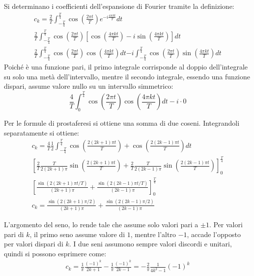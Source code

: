 \documentclass{article}
\begin{document}
Si determinano i coefficienti dell'espansione di Fourier tramite la definizione:
\begin{gather*}
    c_k=\displaystyle\frac{2}{T}\int_{-\frac{T}{4}}^{\frac{T}{4}}\cos\left(\displaystyle\frac{2\pi t}{T}\right)e^{-i\frac{4\pi kt}{T}}dt\\
    \displaystyle\frac{2}{T}\int_{-\frac{T}{4}}^{\frac{T}{4}}\cos\left(\displaystyle\frac{2\pi t}{T}\right)\left[\cos\left(\frac{4\pi kt}{T}\right)-i\sin\left(\frac{4\pi kt}{T}\right)\right]dt\\
    \displaystyle\frac{2}{T}\int_{-\frac{T}{4}}^{\frac{T}{4}}\cos\left(\frac{2\pi t}{T}\right)\cos\left(\frac{4\pi kt}{T}\right)dt
    {-i\int_{-\frac{T}{4}}^{\frac{T}{4}}\cos\left(\frac{2\pi t}{T}\right)\sin\left(\frac{4\pi kt}{T}\right)dt}
\end{gather*}
Poiché è una funzione pari, il primo integrale corrisponde al doppio dell'integrale su solo una metà dell'intervallo, mentre il secondo integrale, essendo una funzione 
dispari, assume valore nullo su un intervallo simmetrico:
\begin{equation*}
    \displaystyle\frac{4}{T}\int_{0}^{\frac{T}{4}}\cos\left(\frac{2\pi t}{T}\right)\cos\left(\frac{4\pi kt}{T}\right)dt-i\cdot0
\end{equation*}


Per le formule di prostaferesi si ottiene una somma di due coseni. Integrandoli separatamente si ottiene:
\begin{gather*}
    c_k=\displaystyle\frac{4}{T}\frac{1}{2}\int_{-\frac{T}{4}}^{\frac{T}{4}}\cos\left(\frac{2(2k+1)\pi t}{T}\right)+\cos\left(\frac{2(2k-1)\pi t}{T}\right)dt\\
    \displaystyle\left[\frac{2}{T}\frac{T}{2(2k+1)\pi}\sin\left(\frac{2(2k+1)\pi t}{T}\right)+
    \frac{2}{T}\frac{T}{2(2k-1)\pi}\sin\left(\frac{2(2k-1)\pi t}{T}\right)\right]_{0}^{\frac{T}{4}}\\
    \left[\displaystyle\frac{\sin(2(2k+1)\pi t/T)}{(2k+1)\pi}+\frac{\sin(2(2k-1)\pi t/T)}{(2k-1)\pi}\right]_0^{\frac{T}{4}}\\
    c_k=\displaystyle\frac{\sin(2(2k+1)\pi/2)}{(2k+1)\pi}+\frac{\sin(2(2k-1)\pi/2)}{(2k-1)\pi}
\end{gather*}

L'argomento del seno, lo rende tale che assume solo valori pari a $\pm1$. Per valori pari di $k$, il primo seno assume valore di $1$, mentre l'altro $-1$, accade l'opposto per 
valori dispari di $k$. 
I due seni assumono sempre valori discordi e unitari, quindi si possono esprimere come: 
\begin{gather}
    c_k=\displaystyle\frac{1}{\pi}\frac{(-1)^k}{2k+1}-\frac{1}{\pi}\frac{(-1)^k}{2k-1}=-\frac{2}{\pi}\frac{1}{4k^2-1}(-1)^k
\end{gather}
\end{document}

